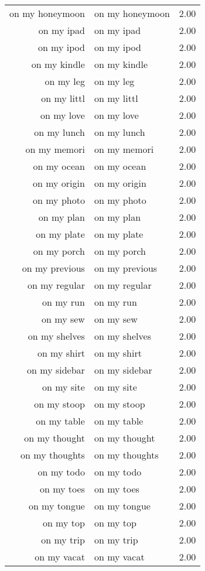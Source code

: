 \begin{table}[ht]
\begin{tabular}{rlr}
  on my honeymoon & on my honeymoon & 2.00 \\ 
  on my ipad & on my ipad & 2.00 \\ 
  on my ipod & on my ipod & 2.00 \\ 
  on my kindle & on my kindle & 2.00 \\ 
  on my leg & on my leg & 2.00 \\ 
  on my littl & on my littl & 2.00 \\ 
  on my love & on my love & 2.00 \\ 
  on my lunch & on my lunch & 2.00 \\ 
  on my memori & on my memori & 2.00 \\ 
  on my ocean & on my ocean & 2.00 \\ 
  on my origin & on my origin & 2.00 \\ 
  on my photo & on my photo & 2.00 \\ 
  on my plan & on my plan & 2.00 \\ 
  on my plate & on my plate & 2.00 \\ 
  on my porch & on my porch & 2.00 \\ 
  on my previous & on my previous & 2.00 \\ 
  on my regular & on my regular & 2.00 \\ 
  on my run & on my run & 2.00 \\ 
  on my sew & on my sew & 2.00 \\ 
  on my shelves & on my shelves & 2.00 \\ 
  on my shirt & on my shirt & 2.00 \\ 
  on my sidebar & on my sidebar & 2.00 \\ 
  on my site & on my site & 2.00 \\ 
  on my stoop & on my stoop & 2.00 \\ 
  on my table & on my table & 2.00 \\ 
  on my thought & on my thought & 2.00 \\ 
  on my thoughts & on my thoughts & 2.00 \\ 
  on my todo & on my todo & 2.00 \\ 
  on my toes & on my toes & 2.00 \\ 
  on my tongue & on my tongue & 2.00 \\ 
  on my top & on my top & 2.00 \\ 
  on my trip & on my trip & 2.00 \\ 
  on my vacat & on my vacat & 2.00 \\ 

\end{tabular}
\end{table}
